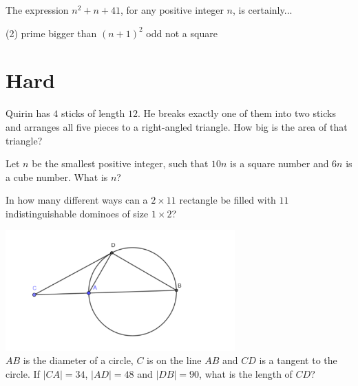 \documentclass{article}
\begin{document}
\begin{problem}
The expression $n^2+n+41$, for any positive integer $n$, is certainly...
\begin{tasks2}(2)
\task prime
\task bigger than $(n+1)^2$
\task odd
\task not a square
\end{tasks2}
\end{problem}

\newpage

\section{Hard}

\begin{problem}
Quirin has $4$ sticks of length $12$. He breaks exactly one of them into two sticks and arranges all five pieces to a right-angled triangle. How big is the area of that triangle?
\end{problem}

\begin{problem}
Let $n$ be the smallest positive integer, such that $10n$ is a square number and $6n$ is a cube number. What is $n$?
\end{problem}

\begin{problem}
In how many different ways can a $2\times 11$ rectangle be filled with $11$ indistinguishable dominoes of size $1\times 2$?
\end{problem}

\begin{problem}
\includegraphics[width=250pt]{Images/img8.png} \\
$AB$ is the diameter of a circle, $C$ is on the line $AB$ and $CD$ is a tangent to the circle. If $|CA|=34$, $|AD|=48$ and $|DB|=90$, what is the length of $CD$?
\end{problem}

\newpage 
\end{document}
